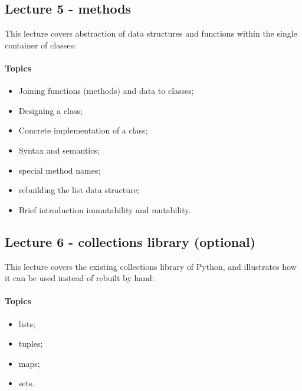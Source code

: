 			\subsection{Lecture 5 - methods}
				This lecture covers abstraction of data structures and functions within the single container of classes:

				\paragraph*{Topics}
					\begin{itemize}
						\item Joining functions (methods) and data to classes;
						\item Designing a class;
						\item Concrete implementation of a class;
						\item Syntax and semantics;
						\item special method names;
						\item rebuilding the list data structure;
						\item Brief introduction immutability and mutability.
					\end{itemize}

			\subsection{Lecture 6 - collections library (optional)}
				This lecture covers the existing collections library of Python, and illustrates how it can be used instead of rebuilt by hand:

				\paragraph*{Topics}
					\begin{itemize}
						\item lists;
						\item tuples;
						\item maps;
						\item sets.
					\end{itemize}
